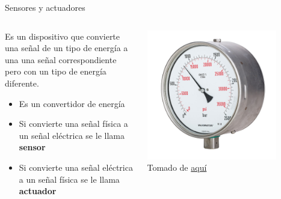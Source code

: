 \documentclass[aspectratio=169]{beamer}
\begin{document}
\begin{frame}{Sensores y actuadores}
    \begin{columns}[c, onlytextwidth]
        \begin{column}{0.6\textwidth}
        Es un dispositivo que convierte una señal de un tipo de energía a una
        una señal correspondiente pero con un tipo de energía diferente.\\[8pt]
        \begin{itemize}
            \item Es un convertidor de energía
            \item Si convierte una señal física a un señal eléctrica se le llama \textbf{sensor}
            \item Si convierte una señal eléctrica a un señal física se le llama \textbf{actuador}
        \end{itemize}
        \end{column}
        \begin{column}{0.4\textwidth}
            \begin{center}
               \includegraphics[width=0.8\textwidth]{fig/bourdon.jpg}\\
               \tiny{Tomado de \href{https://upload.wikimedia.org/wikipedia/commons/thumb/7/74/MAXIMATOR-High-Pressure-Manometer-01a.jpg/1200px-MAXIMATOR-High-Pressure-Manometer-01a.jpg}{aquí}}
            \end{center}
        \end{column}
    \end{columns}
\end{frame}
\end{document}
